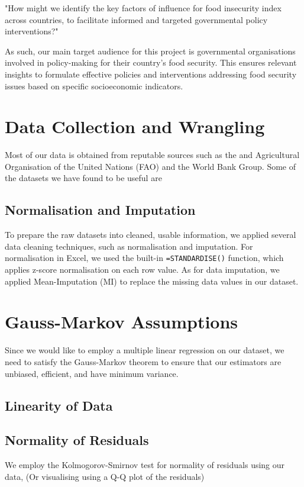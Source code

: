 \documentclass{article}
\begin{document}
\begin{formal}
    "How might we identify the key factors of influence for food insecurity index across countries, to facilitate informed and targeted governmental policy interventions?"
\end{formal}

\noindent As such, our main target audience for this project is governmental organisations involved in policy-making for their country's food security. This ensures relevant insights to formulate effective policies and interventions addressing food security issues based on specific socioeconomic indicators.

\section{Data Collection and Wrangling}
Most of our data is obtained from reputable sources such as the \Food and Agricultural Organisation of the United Nations (FAO) and the World Bank Group. Some of the datasets we have found to be useful are 

\subsection{Normalisation and Imputation}
To prepare the raw datasets into cleaned, usable information, we applied several data cleaning techniques, such as normalisation and imputation. For normalisation in Excel, we used the built-in \verb|=STANDARDISE()| function, which applies z-score normalisation on each row value. As for data imputation, we applied Mean-Imputation (MI) to replace the missing data values in our dataset. 

\section{Gauss-Markov Assumptions}
Since we would like to employ a multiple linear regression on our dataset, we need to satisfy the Gauss-Markov theorem to ensure that our estimators are unbiased, efficient, and have minimum variance.

\subsection{Linearity of Data}

\subsection{Normality of Residuals}
We employ the Kolmogorov-Smirnov test for normality of residuals using our data, (Or visualising using a Q-Q plot of the residuals)  
\end{document}
